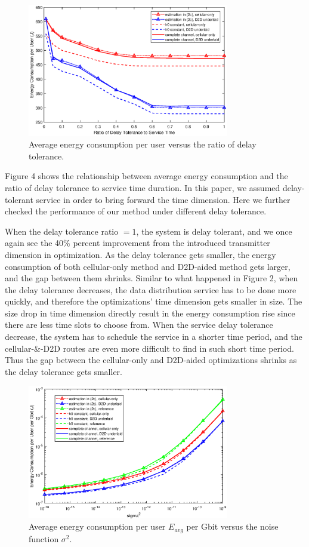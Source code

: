 \documentclass{ieeeaccess}
\begin{document}
\begin{figure} [htb]
\includegraphics*[width=8.8cm]{delays.eps}
\caption{Average energy consumption per user versus the ratio of delay tolerance.} \label{fig:5}
\end{figure}

Figure 4 shows the relationship between average energy consumption and the ratio of delay tolerance to service time duration. In this paper, we assumed delay-tolerant service in order to bring forward the time dimension. Here we further checked the performance of our method under different delay tolerance.

When the delay tolerance ratio $= 1$, the system is delay tolerant, and we once again see the 40\% percent improvement from the introduced transmitter dimension in optimization. As the delay tolerance gets smaller, the energy consumption of both cellular-only method and D2D-aided method gets larger, and the gap between them shrinks. Similar to what happened in Figure 2, when the delay tolerance decreases, the data distribution service has to be done more quickly, and therefore the optimizations' time dimension gets smaller in size. The size drop in time dimension directly result in the energy consumption rise since there are less time slots to choose from. When the service delay tolerance decrease, the system has to schedule the service in a shorter time period, and the cellular-\&-D2D routes are even more difficult to find in such short time period. Thus the gap between the cellular-only and D2D-aided optimizations shrinks as the delay tolerance gets smaller. 

\begin{figure} [htb]
\includegraphics*[width=8.8cm]{sigma2s.eps}
\caption{Average energy consumption per user $E_{avg}$ per Gbit versus the noise function ${\sigma ^2}$.}\label{fig:2}
\end{figure}
\end{document}
